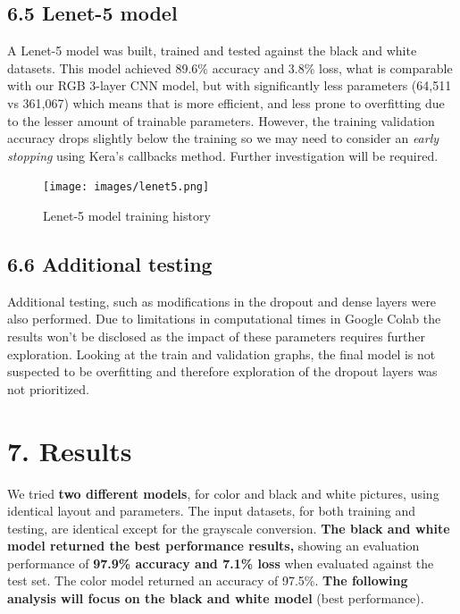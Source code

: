\documentclass[
  11pt,
]{article}
\begin{document}
\hypertarget{lenet-5-model}{%
\subsection{6.5 Lenet-5 model}\label{lenet-5-model}}

A Lenet-5 model was built, trained and tested against the black and
white datasets. This model achieved 89.6\% accuracy and 3.8\% loss, what
is comparable with our RGB 3-layer CNN model, but with significantly
less parameters (64,511 vs 361,067) which means that is more efficient,
and less prone to overfitting due to the lesser amount of trainable
parameters. However, the training validation accuracy drops slightly
below the training so we may need to consider an \emph{early stopping}
using Kera's callbacks method. Further investigation will be required.

\begin{figure}
\centering
\texttt{[image: images/lenet5.png]}
\caption{Lenet-5 model training history}
\end{figure}

\hypertarget{additional-testing}{%
\subsection{6.6 Additional testing}\label{additional-testing}}

Additional testing, such as modifications in the dropout and dense
layers were also performed. Due to limitations in computational times in
Google Colab the results won't be disclosed as the impact of these
parameters requires further exploration. Looking at the train and
validation graphs, the final model is not suspected to be overfitting
and therefore exploration of the dropout layers was not prioritized.

\pagebreak

\hypertarget{results}{%
\section{7. Results}\label{results}}

We tried \textbf{two different models}, for color and black and white
pictures, using identical layout and parameters. The input datasets, for
both training and testing, are identical except for the grayscale
conversion. \textbf{The black and white model returned the best
performance results,} showing an evaluation performance of
\textbf{97.9\% accuracy and 7.1\% loss} when evaluated against the test
set. The color model returned an accuracy of 97.5\%. \textbf{The
following analysis will focus on the black and white model} (best
performance).
\end{document}

